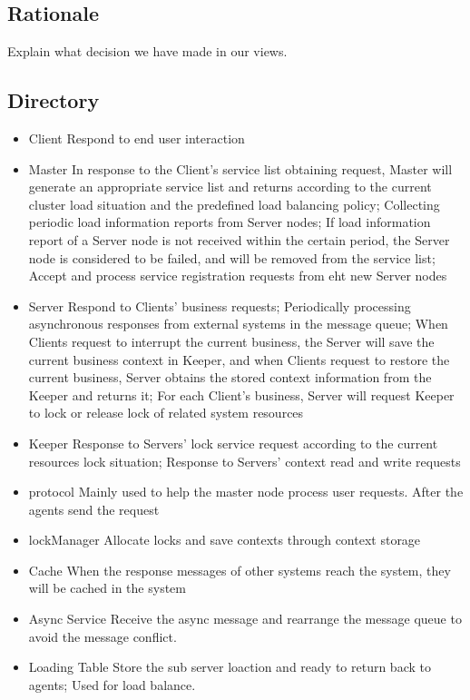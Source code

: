 \documentclass{article}
\begin{document}
	\subsection{Rationale}
	Explain what decision we have made in our views.

	\subsection{Directory}

	\begin{itemize}
		\item{Client} Respond to end user interaction
		\item{Master} In response to the Client's service list obtaining request, Master will generate an appropriate service list and returns according to the current cluster load situation and the predefined load balancing policy; Collecting periodic load information reports from Server nodes; If load information report of a Server node is not received within the certain period, the Server node is considered to be failed, and will be removed from the service list; Accept and process service registration requests from eht new Server nodes			
		\item{Server} Respond to Clients' business requests; Periodically processing asynchronous responses from external systems  in the message queue; When Clients request to interrupt the current business, the Server will save the current business context in Keeper, and when Clients request to restore the current business, Server obtains the stored context information from the Keeper and returns it; For each Client's business, Server will request Keeper to lock or release lock of related system resources 			
		\item{Keeper} Response to Servers' lock service request according to the current resources lock situation; Response to Servers' context read and write requests			
		\item{protocol} Mainly used to help the master node process user requests. After the agents send the request
		\item{lockManager} Allocate locks and save contexts through context storage
		\item{Cache} When the response messages of other systems reach the system, they will be cached in the system
		\item{Async Service} Receive the async message and rearrange the message queue to avoid the message conflict.
		\item{Loading Table} Store the sub server loaction and ready to return back to agents; Used for load balance.
	\end{itemize}
\end{document}
